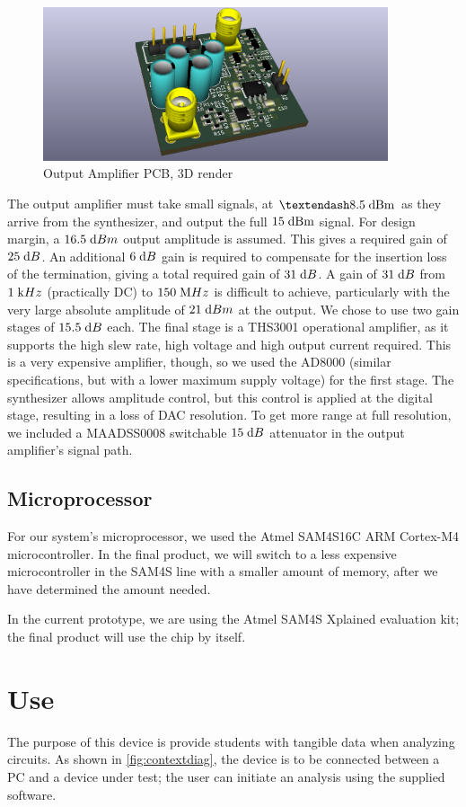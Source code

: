 \begin{figure}[H]
\centering
\includegraphics[width=4in]{outamp3d.png}
\caption{Output Amplifier PCB, 3D render}
\label{fig:outamp3d}
\end{figure}

The output amplifier must take small signals, at $–8.5\;\mr{dBm}$ as they arrive from
the synthesizer, and output the full $15\;\mathrm{dBm}$  signal. For design margin, a $16.5\;\mathrm{d}Bm$
 output amplitude is assumed. This gives a required gain of $25\;\mathrm{d}B$. An
additional $6\;\mathrm{d}B$ gain is required to compensate for the insertion loss of the
termination, giving a total required gain of $31\;\mathrm{d}B$.  A gain of $31\;\mathrm{d}B$ from $1\;\mathrm{k}Hz$
(practically DC) to $150\;\mathrm{M}Hz$ is difficult to achieve, particularly with the very
large absolute amplitude of $21\;\mathrm{d}Bm$ at the output. We chose to use two gain
stages of $15.5\;\mathrm{d}B$ each. The final stage is a THS3001 operational amplifier, as
it supports the high slew rate, high voltage and high output current required.
This is a very expensive amplifier, though, so we used the AD8000 (similar
specifications, but with a lower maximum supply voltage) for the first stage.
The synthesizer allows amplitude control, but this control is applied at the
digital stage, resulting in a loss of DAC resolution. To get more range at full
resolution, we included a MAADSS0008 switchable $15\;\mathrm{d}B$ attenuator in the output
amplifier's signal path.

\subsection{Microprocessor}
For our system's microprocessor, we used the Atmel SAM4S16C ARM Cortex-M4
microcontroller. In the final product, we will switch to a less expensive
microcontroller in the SAM4S line with a smaller amount of memory, after we
have determined the amount needed.

In the current prototype, we are using the Atmel SAM4S Xplained evaluation kit;
the final product will use the chip by itself.

\section{Use}
The purpose of this device is provide students with tangible data when analyzing
circuits. As shown in \autoref{fig:contextdiag}, the device is to be connected between
a PC and a device under test; the user can initiate an analysis using the supplied software.
